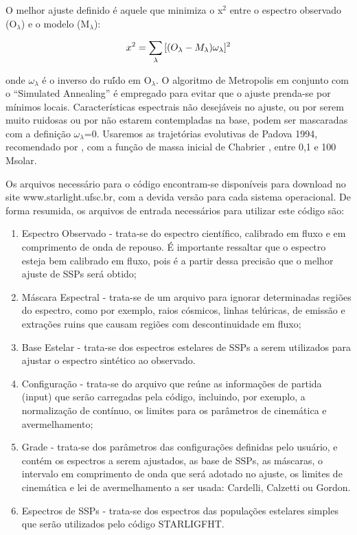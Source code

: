 O melhor ajuste definido é aquele que minimiza o x$^2$ entre o espectro observado (O$_\lambda$) e o modelo (M$_\lambda$):

 \begin{displaymath}
 \centering{
x^{2}=\sum_{\lambda}{}[(O_\lambda-M_\lambda)\omega_\lambda]^{2}}
\end{displaymath}

\noindent onde $\omega_\lambda$ é o inverso do ruí́do em O$_\lambda$. O algoritmo de Metropolis em conjunto com o “Simulated Annealing” \cite{mackay2003information} é empregado para evitar que o ajuste prenda-se por mínimos locais. Características espectrais não desejáveis no ajuste, ou por serem muito ruidosas ou por não estarem contempladas na base, podem ser mascaradas com a definição $\omega_\lambda$=0. Usaremos as trajetórias evolutivas de Padova 1994, recomendado por \cite{bruzual2003stellar}, com a função de massa inicial de Chabrier \cite{chabrier2003galactic}, entre 0,1 e 100 Msolar.

Os arquivos necessário para o código encontram-se disponíveis para download no site www.starlight.ufsc.br, com a devida versão para cada sistema operacional. De forma resumida, os arquivos de entrada necessários para utilizar este código são:

\begin{enumerate}

\item Espectro Observado - trata-se do espectro científico, calibrado em fluxo e em comprimento de onda de repouso. É importante ressaltar que o espectro esteja bem calibrado em fluxo, pois é a partir dessa precisão que o melhor ajuste de SSPs será obtido;

\item Máscara Espectral - trata-se de um arquivo para ignorar determinadas  regiões do espectro, como por exemplo, raios cósmicos, linhas telúricas, de emissão e extrações ruins que causam regiões com descontinuidade em fluxo;

\item Base Estelar - trata-se dos espectros estelares de SSPs a serem utilizados para ajustar o espectro sintético ao observado. 

\item Configuração - trata-se do arquivo que reúne as informações de partida (input) que serão carregadas pela código, incluindo, por exemplo, a normalização de contínuo, os limites para os parâmetros de cinemática e avermelhamento; 

\item Grade -  trata-se dos parâmetros das configurações definidas pelo usuário, e contém os espectros a serem ajustados, as base de SSPs, as máscaras, o intervalo em comprimento de onda que será adotado no ajuste, os limites de cinemática e lei de avermelhamento a ser usada: Cardelli, Calzetti ou Gordon.

\item Espectros de SSPs - trata-se dos espectros das populações estelares simples que serão utilizados pelo código STARLIGFHT.

\end{enumerate}

